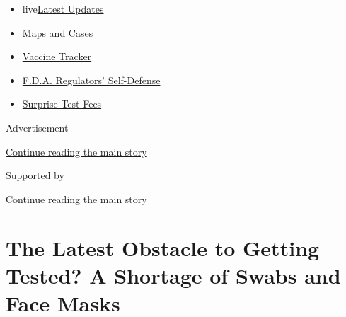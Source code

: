 \begin{itemize}
\tightlist
\item
  live\href{https://www.nytimes3xbfgragh.onion/2020/09/11/world/covid-19-coronavirus.html?name=styln-coronavirus-national\&region=TOP_BANNER\&block=storyline_menu_recirc\&action=click\&pgtype=Article\&impression_id=9cc9e111-f4b7-11ea-84c5-ff3c2ad4221c\&variant=undefined}{Latest
  Updates}
\item
  \href{https://www.nytimes3xbfgragh.onion/interactive/2020/us/coronavirus-us-cases.html?name=styln-coronavirus-national\&region=TOP_BANNER\&block=storyline_menu_recirc\&action=click\&pgtype=Article\&impression_id=9cc9e112-f4b7-11ea-84c5-ff3c2ad4221c\&variant=undefined}{Maps
  and Cases}
\item
  \href{https://www.nytimes3xbfgragh.onion/interactive/2020/science/coronavirus-vaccine-tracker.html?name=styln-coronavirus-national\&region=TOP_BANNER\&block=storyline_menu_recirc\&action=click\&pgtype=Article\&impression_id=9cc9e113-f4b7-11ea-84c5-ff3c2ad4221c\&variant=undefined}{Vaccine
  Tracker}
\item
  \href{https://www.nytimes3xbfgragh.onion/2020/09/10/us/politics/fda-coronavirus-vaccine.html?name=styln-coronavirus-national\&region=TOP_BANNER\&block=storyline_menu_recirc\&action=click\&pgtype=Article\&impression_id=9cc9e114-f4b7-11ea-84c5-ff3c2ad4221c\&variant=undefined}{F.D.A.
  Regulators' Self-Defense}
\item
  \href{https://www.nytimes3xbfgragh.onion/2020/09/09/upshot/coronavirus-surprise-test-fees.html?name=styln-coronavirus-national\&region=TOP_BANNER\&block=storyline_menu_recirc\&action=click\&pgtype=Article\&impression_id=9cc9e115-f4b7-11ea-84c5-ff3c2ad4221c\&variant=undefined}{Surprise
  Test Fees}
\end{itemize}

Advertisement

\protect\hyperlink{after-top}{Continue reading the main story}

Supported by

\protect\hyperlink{after-sponsor}{Continue reading the main story}

\hypertarget{the-latest-obstacle-to-getting-tested-a-shortage-of-swabs-and-face-masks}{%
\section{The Latest Obstacle to Getting Tested? A Shortage of Swabs and
Face
Masks}\label{the-latest-obstacle-to-getting-tested-a-shortage-of-swabs-and-face-masks}}

